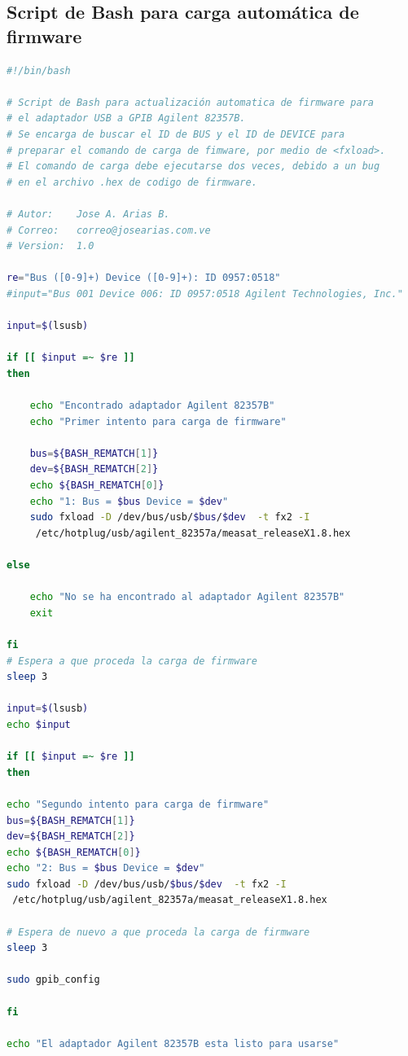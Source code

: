 \documentclass[paper=letter,oneside,fontsize=11pt, parskip=full]{scrartcl}
\begin{document}
	\subsection{Script de Bash para carga automática de firmware}
	
	\begin{lstlisting}[language=bash,caption={bash version}]
#!/bin/bash 

# Script de Bash para actualización automatica de firmware para 
# el adaptador USB a GPIB Agilent 82357B.
# Se encarga de buscar el ID de BUS y el ID de DEVICE para 
# preparar el comando de carga de fimware, por medio de <fxload>. 
# El comando de carga debe ejecutarse dos veces, debido a un bug 
# en el archivo .hex de codigo de firmware.

# Autor: 	Jose A. Arias B.
# Correo: 	correo@josearias.com.ve
# Version:	1.0

re="Bus ([0-9]+) Device ([0-9]+): ID 0957:0518"
#input="Bus 001 Device 006: ID 0957:0518 Agilent Technologies, Inc."

input=$(lsusb)

if [[ $input =~ $re ]] 
then 

	echo "Encontrado adaptador Agilent 82357B"
	echo "Primer intento para carga de firmware"

	bus=${BASH_REMATCH[1]}
	dev=${BASH_REMATCH[2]}
	echo ${BASH_REMATCH[0]}
	echo "1: Bus = $bus Device = $dev"
	sudo fxload -D /dev/bus/usb/$bus/$dev  -t fx2 -I 
	 /etc/hotplug/usb/agilent_82357a/measat_releaseX1.8.hex

else 

	echo "No se ha encontrado al adaptador Agilent 82357B"
	exit

fi
# Espera a que proceda la carga de firmware
sleep 3

input=$(lsusb)
echo $input

if [[ $input =~ $re ]]
then

echo "Segundo intento para carga de firmware"
bus=${BASH_REMATCH[1]}
dev=${BASH_REMATCH[2]}
echo ${BASH_REMATCH[0]}
echo "2: Bus = $bus Device = $dev"
sudo fxload -D /dev/bus/usb/$bus/$dev  -t fx2 -I
 /etc/hotplug/usb/agilent_82357a/measat_releaseX1.8.hex

# Espera de nuevo a que proceda la carga de firmware
sleep 3

sudo gpib_config

fi

echo "El adaptador Agilent 82357B esta listo para usarse"
	\end{lstlisting}	

		
\end{document}
